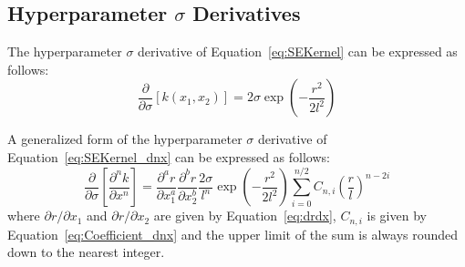 \documentclass{article}
\begin{document}
\subsection{Hyperparameter $\sigma$ Derivatives}
\label{subsec:SEHypDer_s}

The hyperparameter $\sigma$ derivative of Equation~\eqref{eq:SEKernel} can be expressed as follows:
\begin{equation}
\label{eq:SEKernel_ds}
	\frac{\partial}{\partial \sigma} \left[k\!\left(x_1,x_2\right)\right] = 2 \sigma \exp{\left(-\frac{r^2}{2l^2}\right)}
\end{equation}

\begin{comment}
\begin{equation}
\label{eq:SEKernel_ds_d1x}
	\begin{gathered}
	\frac{\partial}{\partial \sigma} \left[\frac{\partial k\!\left(x_1,x_2\right)}{\partial x_1}\right] = - \frac{\partial r}{\partial x_1} \frac{2 \sigma r}{l^2} \exp{\left(-\frac{r^2}{2l^2}\right)} \\
	\frac{\partial}{\partial \sigma} \left[\frac{\partial k\!\left(x_1,x_2\right)}{\partial x_2}\right] = - \frac{\partial r}{\partial x_2} \frac{2 \sigma r}{l^2} \exp{\left(-\frac{r^2}{2l^2}\right)}
	\end{gathered}
\end{equation}

\begin{equation}
\label{eq:SEKernel_ds_d2x}
	\frac{\partial}{\partial \sigma} \left[\frac{\partial^2 k\!\left(x_1,x_2\right)}{\partial x_1 \partial x_2}\right] = \frac{\partial r}{\partial x_1} \frac{\partial r}{\partial x_2} \frac{2 \sigma}{l^2} \left(\frac{r^2}{l^2} - 1\right) \exp{\left(-\frac{r^2}{2l^2}\right)}
\end{equation}
\end{comment}

A generalized form of the hyperparameter $\sigma$ derivative of Equation~\eqref{eq:SEKernel_dnx} can be expressed as follows:
\begin{equation}
\label{eq:SEKernel_ds_dnx}
	\frac{\partial}{\partial \sigma} \left[\frac{\partial^n k}{\partial x^n}\right] = \frac{\partial^a r}{\partial x_1^a} \frac{\partial^b r}{\partial x_2^b} \frac{2 \sigma}{l^n} \exp{\left(-\frac{r^2}{2l^2}\right)} \sum_{i=0}^{n/2} C_{n,i} \left(\frac{r}{l}\right)^{n-2i}
\end{equation}
where $\partial r/\partial x_1$ and $\partial r/\partial x_2$ are given by Equation~\eqref{eq:drdx}, $C_{n,i}$ is given by Equation~\eqref{eq:Coefficient_dnx} and the upper limit of the sum is always rounded down to the nearest integer.
\end{document}
